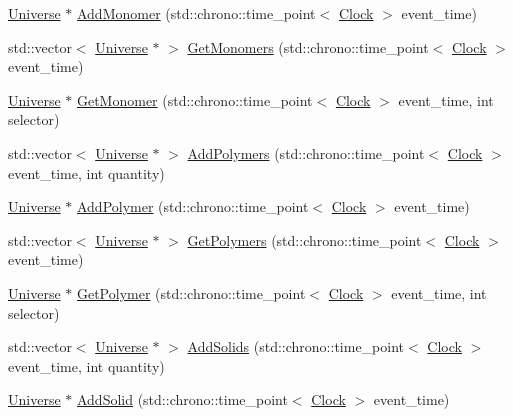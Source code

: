 \begin{DoxyCompactItemize}
\item 
\hyperlink{class_universe}{Universe} $\ast$ \hyperlink{class_universe_a062a9472f0400e566ecc7dc056d989d9}{Add\+Monomer} (std\+::chrono\+::time\+\_\+point$<$ \hyperlink{universe_8h_a0ef8d951d1ca5ab3cfaf7ab4c7a6fd80}{Clock} $>$ event\+\_\+time)
\item 
std\+::vector$<$ \hyperlink{class_universe}{Universe} $\ast$ $>$ \hyperlink{class_universe_aca82a914e0f8bd7cd1ec80a7220f0a0e}{Get\+Monomers} (std\+::chrono\+::time\+\_\+point$<$ \hyperlink{universe_8h_a0ef8d951d1ca5ab3cfaf7ab4c7a6fd80}{Clock} $>$ event\+\_\+time)
\item 
\hyperlink{class_universe}{Universe} $\ast$ \hyperlink{class_universe_aaa03fb8178d790afd992dd094bb64b47}{Get\+Monomer} (std\+::chrono\+::time\+\_\+point$<$ \hyperlink{universe_8h_a0ef8d951d1ca5ab3cfaf7ab4c7a6fd80}{Clock} $>$ event\+\_\+time, int selector)
\item 
std\+::vector$<$ \hyperlink{class_universe}{Universe} $\ast$ $>$ \hyperlink{class_universe_aed7cb25507d516a2821ebb69d5345c54}{Add\+Polymers} (std\+::chrono\+::time\+\_\+point$<$ \hyperlink{universe_8h_a0ef8d951d1ca5ab3cfaf7ab4c7a6fd80}{Clock} $>$ event\+\_\+time, int quantity)
\item 
\hyperlink{class_universe}{Universe} $\ast$ \hyperlink{class_universe_a4ea0af5d2eb7b5070a83f7da29526fbd}{Add\+Polymer} (std\+::chrono\+::time\+\_\+point$<$ \hyperlink{universe_8h_a0ef8d951d1ca5ab3cfaf7ab4c7a6fd80}{Clock} $>$ event\+\_\+time)
\item 
std\+::vector$<$ \hyperlink{class_universe}{Universe} $\ast$ $>$ \hyperlink{class_universe_aac5d1c1a3a3ba56c8ca7115a85b2c239}{Get\+Polymers} (std\+::chrono\+::time\+\_\+point$<$ \hyperlink{universe_8h_a0ef8d951d1ca5ab3cfaf7ab4c7a6fd80}{Clock} $>$ event\+\_\+time)
\item 
\hyperlink{class_universe}{Universe} $\ast$ \hyperlink{class_universe_a2d5d3924a7d7ffd2a5f47be9f137d86e}{Get\+Polymer} (std\+::chrono\+::time\+\_\+point$<$ \hyperlink{universe_8h_a0ef8d951d1ca5ab3cfaf7ab4c7a6fd80}{Clock} $>$ event\+\_\+time, int selector)
\item 
std\+::vector$<$ \hyperlink{class_universe}{Universe} $\ast$ $>$ \hyperlink{class_universe_a410d5ba2224fe90584b1f1aa5b38b41c}{Add\+Solids} (std\+::chrono\+::time\+\_\+point$<$ \hyperlink{universe_8h_a0ef8d951d1ca5ab3cfaf7ab4c7a6fd80}{Clock} $>$ event\+\_\+time, int quantity)
\item 
\hyperlink{class_universe}{Universe} $\ast$ \hyperlink{class_universe_a598799e2fcdf9ed60e83e9f5a61bfc05}{Add\+Solid} (std\+::chrono\+::time\+\_\+point$<$ \hyperlink{universe_8h_a0ef8d951d1ca5ab3cfaf7ab4c7a6fd80}{Clock} $>$ event\+\_\+time)

\end{DoxyCompactItemize}

